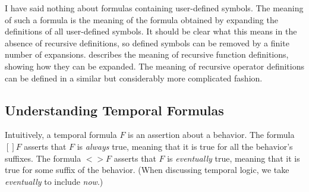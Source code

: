 \documentclass[fleqn,leqno]{article}
\begin{document}
\medskip

I have said nothing about formulas containing user-defined symbols.
The meaning of such a formula is the meaning of the formula obtained by
expanding the definitions of all user-defined symbols.  It should be
clear what this means in the absence of recursive definitions, so
defined symbols can be removed by a finite number of expansions.
describes the meaning of recursive function definitions, showing how
they can be expanded.  The meaning of recursive operator definitions
can be defined in a similar but considerably more complicated fashion.

\subsection{Understanding Temporal Formulas}

%
Intuitively, a temporal formula $F$ is an assertion about a behavior.
The formula $[]F$ asserts that $F$ is \emph{always} true, meaning that it
is true for all the behavior's suffixes.  The formula $<>F$ asserts
that $F$ is \emph{eventually} true, meaning that it is true for some
suffix of the behavior.  (When discussing temporal logic, we take
\emph{eventually} to include \emph{now}.)
\end{document}
